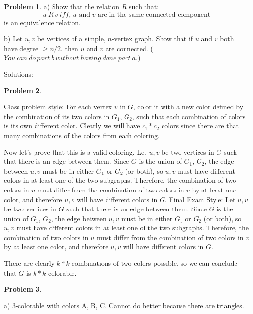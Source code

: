 \documentclass{amsart}
\theoremstyle{definition}
\newtheorem{problem}{Problem}
\theoremstyle{remark}
\begin{document}
\begin{problem}
a) Show that the relation $R$ such that: 
\[
u\ R\ v\ \text{$iff$, $u$ and $v$ are in the same connected component}
\]
is an equivalence relation.

b) Let $u,v$ be vertices of a simple, $n$-vertex graph.  Show that if $u$ and $v$ both have degree $\geq n/2$, then $u$ and $v$ are connected.  ($You\ can\ do\ part\ b\ without\ having\ done\ part\ a.$)
\end{problem}

\newpage
Solutions:
\setcounter{problem}{0}
\begin{problem}
\end{problem}
Class problem style:
For each vertex $v$ in $G$, color it with a new color defined by the combination of its two colors in $G_1$, $G_2$, such that each combination of colors is its own different color.  Clearly we will have $c_1 * c_2$ colors since there are that many combinations of the colors from each coloring.  

Now let's prove that this is a valid coloring.  Let $u,v$ be two vertices in $G$ such that there is an edge between them.  Since $G$ is the union of $G_1$, $G_2$, the edge between $u,v$ must be in either $G_1$ or $G_2$ (or both), so $u,v$ must have different colors in at least one of the two subgraphs.  Therefore, the combination of two colors in $u$ must differ from the combination of two colors in $v$ by at least one color, and therefore $u,v$ will have different colors in $G$.
\newline
\newline
Final Exam Style:
Let $u,v$ be two vertices in $G$ such that there is an edge between them.  Since $G$ is the union of $G_1$, $G_2$, the edge between $u,v$ must be in either $G_1$ or $G_2$ (or both), so $u,v$ must have different colors in at least one of the two subgraphs.  Therefore, the combination of two colors in $u$ must differ from the combination of two colors in $v$ by at least one color, and therefore $u,v$ will have different colors in $G$.

There are clearly $k*k$ combinations of two colors possible, so we can conclude that $G$ is $k*k$-colorable.

\begin{problem}
\end{problem}
a) 3-colorable with colors A, B, C. Cannot do better because there are triangles.
\end{document}
